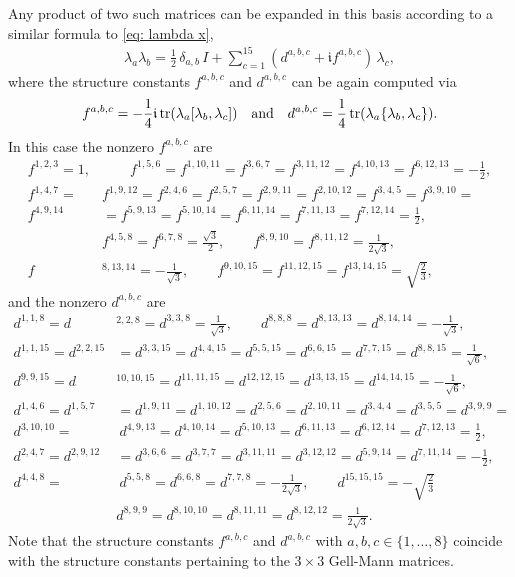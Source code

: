 \documentclass[12pt,dvipsnames,accepted=2016-08-18,a4paper,onecolumn]{quantumarticle}
\numberwithin{equation}{section}
\theoremstyle{definition}
\begin{document}
Any product of two such matrices can be expanded in this basis according to a similar formula to \eqref{eq: lambda x},
\begin{align}\label{eq: lambda4 x}
	\lambda_a \lambda_b = \frac{1}{2}\, \delta_{a,b}\,I + \sum_{c=1}^{15} (d^{a,b,c} + \mathfrak{i}f^{a,b,c}) \, \lambda_c, 
\end{align}
where the structure constants $f^{a,b,c}$ and $d^{a,b,c}$ can be again computed via
$$
f^{a,b,c} = -\frac{1}{4} \mathfrak{i}\, \text{\textnormal{tr}}(\lambda_a[\lambda_b,\lambda_c]) \quad \text{and} \quad
d^{a,b,c} = \frac{1}{4}\, \text{\textnormal{tr}}(\lambda_a\{\lambda_b,\lambda_c\}).
$$
In this case the nonzero $f^{a,b,c}$ are
\begin{align*}
	f^{1, 2, 3}=1,& \quad \quad
	f^{1, 5, 6} = f^{1, 10, 11}= f^{3, 6, 7} = f^{3, 11, 12} = f^{4, 10, 13}= f^{6, 12, 13}= -\frac{1}{2},\\
	f^{1, 4, 7}=& f^{1, 9, 12}= f^{2, 4, 6}=  
	f^{2, 5, 7}= f^{2, 9, 11}= f^{2, 10, 12}= f^{3, 4, 5}= f^{3, 9, 10}= \\
	f^{4, 9, 14}& =  f^{5, 9, 13}= f^{5, 10, 14} = f^{6, 11, 14}=  f^{7, 11, 13}= f^{7, 12, 14}=\frac{1}{2},\\
	&f^{4, 5, 8}= f^{6, 7, 8}=\frac{\sqrt{3}}{2},  \quad \quad
	f^{8, 9, 10}= f^{8, 11, 12}=\frac{1}{2 \sqrt{3}}, \\
	f&^{8, 13, 14}=-\frac{1}{\sqrt{3}}, \quad \quad
	f^{9, 10, 15}= f^{11, 12, 15}= f^{13, 14, 15}=\sqrt{\frac{2}{3}},
\end{align*}
and the nonzero $d^{a,b,c}$ are
\begin{align*}
	d^{1, 1, 8} = d&^{2, 2, 8}=d^{3, 3, 8}=\frac{1}{\sqrt{3}}, \quad \quad d^{8, 8, 8}=d^{8, 13, 13}= d^{8, 14, 14}=-\frac{1}{\sqrt{3}}, \\
	d^{1, 1, 15}= d^{2, 2, 15}&=d^{3, 3, 15}=d^{4, 4, 15}=d^{5, 5, 15}=d^{6, 6, 15}=d^{7, 7, 15}=d^{8, 8, 15}=\frac{1}{\sqrt{6}}, \\
	d^{9, 9, 15}= d&^{10, 10, 15}= d^{11, 11, 15}=d^{12, 12, 15}= d^{13, 13, 15}= d^{14, 14, 15}=-\frac{1}{\sqrt{6}}, \\
	d^{1, 4, 6} = d^{1, 5, 7}&= d^{1, 9, 11}= d^{1, 10, 12}=d^{2, 5, 6}=d^{2, 10, 11}=d^{3, 4, 4}=d^{3, 5, 5}=d^{3, 9, 9}= \\
	d^{3, 10, 10}=& \ d^{4, 9, 13}=d^{4, 10, 14}=d^{5, 10, 13}=d^{6, 11, 13}= d^{6, 12, 14}=d^{7, 12, 13}=\frac{1}{2},\\
	d^{2, 4, 7}=d^{2, 9, 12}&=d^{3, 6, 6}= d^{3, 7, 7}=d^{3, 11, 11}=d^{3, 12, 12}= d^{5, 9, 14}=d^{7, 11, 14}=-\frac{1}{2},\\
	d^{4, 4, 8}=& \ d^{5, 5, 8}=d^{6, 6, 8}=d^{7, 7, 8}=-\frac{1}{2 \sqrt{3}}, \quad \quad
	d^{15, 15, 15}=-\sqrt{\frac{2}{3}}\\
	&d^{8, 9, 9}= d^{8, 10, 10}= d^{8, 11, 11}=d^{8, 12, 12}=\frac{1}{2 \sqrt{3}}. 
\end{align*}
Note that the structure constants $f^{a,b,c}$ and $d^{a,b,c}$ with $a,b,c\in\{1,\ldots,8\}$ coincide with the structure constants pertaining to the $3 \times 3$ Gell-Mann matrices.
\end{document}
